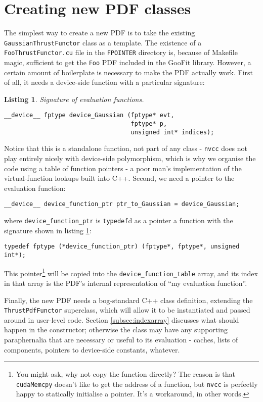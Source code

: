\documentclass[12pt,pdflatex]{article}
\newtheorem{listing}{Listing}
\begin{document}
\section{Creating new PDF classes}
\label{sec:newpdfs}

The simplest way to create a new PDF is to take the existing 
\texttt{GaussianThrustFunctor} class as a template. The existence of
a \texttt{FooThrustFunctor.cu} file in the \texttt{FPOINTER} directory
is, because of Makefile magic, sufficient to get the \texttt{Foo} PDF
included in the GooFit library. However, a certain amount of boilerplate
is necessary to make the PDF actually work. First of all, it needs a 
device-side function with a particular signature:
\begin{listing}
\label{listing:fsign}
Signature of evaluation functions.

\begin{verbatim}
__device__ fptype device_Gaussian (fptype* evt, 
                                   fptype* p, 
                                   unsigned int* indices); 
\end{verbatim}
\end{listing}

Notice that this is a standalone function, not part of any class - \texttt{nvcc}
does not play entirely nicely with device-side polymorphism, which is why we organise the
code using a table of function pointers - a poor man's implementation of the
virtual-function lookups built into C++. Second, we need a pointer to the 
evaluation function:
\begin{verbatim}
__device__ device_function_ptr ptr_to_Gaussian = device_Gaussian; 
\end{verbatim}
where \texttt{device\_function\_ptr} is \texttt{typedef}d as a pointer
a function with the signature shown in listing \ref{listing:fsign}:
\begin{verbatim}
typedef fptype (*device_function_ptr) (fptype*, fptype*, unsigned int*);
\end{verbatim}
This pointer\footnote{You might ask, why not copy the
function directly? The reason is that \texttt{cudaMemcpy} doesn't
like to get the address of a function, but \texttt{nvcc} is perfectly
happy to statically initialise a pointer. It's a workaround, in other
words.} 
will be copied into the \texttt{device\_function\_table} array,
and its index in that array is the PDF's internal representation of ``my evaluation
function''. 

Finally, the new PDF needs a bog-standard C++ class definition, extending
the \texttt{ThrustPdfFunctor} superclass, which will allow it to be instantiated
and passed around in user-level code. Section \ref{subsec:indexarray} discusses
what should happen in the constructor; otherwise the class may have any supporting
paraphernalia that are necessary or useful to its evaluation - caches, 
lists of components, pointers to device-side constants, whatever. 
\end{document}
